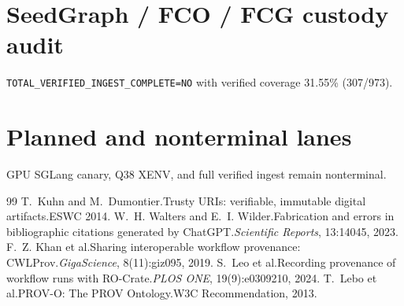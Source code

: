 \section{SeedGraph / FCO / FCG custody audit}
\label{app:seedgraph}
\texttt{TOTAL\_VERIFIED\_INGEST\_COMPLETE=NO} with verified coverage 31.55\% (307/973).

\section{Planned and nonterminal lanes}
\label{app:planned}
GPU SGLang canary, Q38 XENV, and full verified ingest remain nonterminal.

\begin{thebibliography}{99}
T.~Kuhn and M.~Dumontier.\newblock Trusty URIs: verifiable, immutable digital artifacts.\newblock ESWC 2014.
W.~H. Walters and E.~I. Wilder.\newblock Fabrication and errors in bibliographic citations generated by ChatGPT.\newblock \emph{Scientific Reports}, 13:14045, 2023.
F.~Z. Khan et al.\newblock Sharing interoperable workflow provenance: CWLProv.\newblock \emph{GigaScience}, 8(11):giz095, 2019.
S.~Leo et al.\newblock Recording provenance of workflow runs with RO-Crate.\newblock \emph{PLOS ONE}, 19(9):e0309210, 2024.
T.~Lebo et al.\newblock PROV-O: The PROV Ontology.\newblock W3C Recommendation, 2013.

\end{thebibliography}
